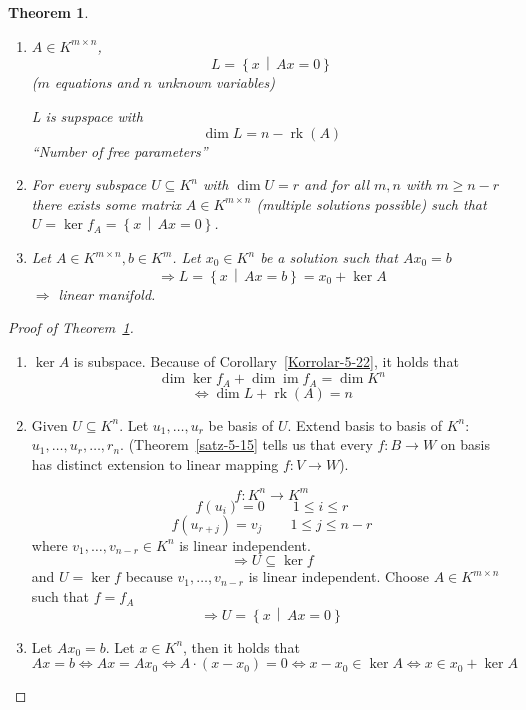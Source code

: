 \documentclass[a4paper,landscape,twocolumn]{article}
\newcommand\setdef[2]{\left\{#1\,\middle|\,#2\right\}}
\newtheorem{theorem}{Theorem}
\DeclareMathOperator\image{im} %
\DeclareMathOperator\kernel{ker} %
\begin{document}
\begin{theorem}
  \label{satz-6.44}
  \begin{enumerate}
    \item $A \in K^{m\times n}$,
      \[ L = \setdef{x}{Ax = 0} \]
      ($m$ equations and $n$ unknown variables)

      L is supspace with
      \[ \dim{L} = n - \operatorname{rk}(A) \]
      \enquote{Number of free parameters}
    \item
      For every subspace $U \subseteq K^n$ with $\dim{U} = r$
      and for all $m,n$ with $m \geq n - r$ there exists some
      matrix $A \in K^{m \times n}$ (multiple solutions possible)
      such that $U = \kernel{f_A} = \setdef{x}{Ax = 0}$.
    \item Let $A \in K^{m\times n}, b \in K^m$.
      Let $x_0 \in K^n$ be a solution such that $Ax_0 = b$
      \[ \Rightarrow L = \setdef{x}{Ax = b} = x_0 + \kernel{A} \]
      $\Rightarrow$ linear manifold.
  \end{enumerate}
\end{theorem}
\begin{proof}[Proof of Theorem~\ref{satz-6.44}]
  \begin{enumerate}
    \item
      $\kernel{A}$ is subspace. Because of Corollary~\ref{Korrolar-5-22}, it holds that
      \[ \dim{\kernel{f_A}} + \dim{\image{f_A}} = \dim{K^n} \]
      \[ \Leftrightarrow \dim{L} + \operatorname{rk}(A) = n \]
    \item
      Given $U \subseteq K^n$.
      Let $u_1, \ldots, u_r$ be basis of $U$.
      Extend basis to basis of $K^n$: $u_1, \ldots, u_r, \ldots, r_n$.
      (Theorem~\ref{satz-5-15} tells us that every $f: B \to W$ on basis
      has distinct extension to linear mapping $f: V \to W$).

      \[ f: K^n \to K^m \]
      \[ f(u_i) = 0 \qquad 1 \leq i \leq r \]
      \[ f(u_{r + j}) = v_j \qquad 1 \leq j \leq n - r \]
      where $v_1, \ldots, v_{n-r} \in K^n$ is linear independent.
      \[ \Rightarrow U \subseteq \kernel{f} \]
      and $U = \kernel{f}$ because $v_1, \ldots, v_{n-r}$ is linear independent.
      Choose $A \in K^{m\times n}$ such that $f = f_A$
      \[ \Rightarrow U = \setdef{x}{Ax = 0} \]
    \item Let $Ax_0 = b$.
      Let $x \in K^n$, then it holds that
      \[
        Ax = b \Leftrightarrow Ax = Ax_0 \Leftrightarrow A \cdot (x - x_0) = 0
        \Leftrightarrow x - x_0 \in \kernel{A}
        \Leftrightarrow x \in x_0 + \kernel{A}
      \]
  \end{enumerate}
\end{proof}
\end{document}
